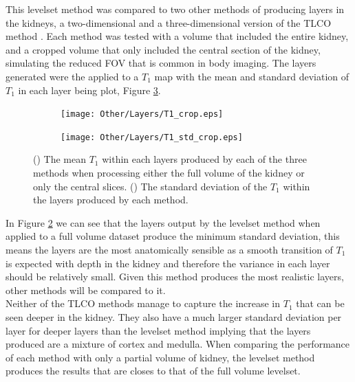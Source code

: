 This levelset method was compared to two other methods of producing layers in the kidneys, a two-dimensional and a three-dimensional version of the \ac{TLCO} method \cite{piskunowicz_new_2015, milani_reduction_2017}. Each method was tested with a volume that included the entire kidney, and a cropped volume that only included the central section of the kidney, simulating the reduced \ac{FOV} that is common in body imaging. The layers generated were the applied to a $T_1$ map with the mean and standard deviation of $T_1$ in each layer being plot, Figure \ref{fig:layers_comp}.

\begin{figure}[H]
	\centering
	\begin{subfigure}[c]{0.47\textwidth}
		\centering
		\texttt{[image: Other/Layers/T1\_crop.eps]}
		\caption{}
		\label{fig:layers_t1_comp}
	\end{subfigure}
	\hfill
	\begin{subfigure}[c]{0.47\textwidth}
		\centering
		\texttt{[image: Other/Layers/T1\_std\_crop.eps]}
		\caption{}
		\label{fig:layers_t1_std_comp}
	\end{subfigure}
	\caption{() The mean $T_1$ within each layers produced by each of the three methods when processing either the full volume of the kidney or only the central slices. () The standard deviation of the $T_1$ within the layers produced by each method.}
	\label{fig:layers_comp}
\end{figure}

In Figure \ref{fig:layers_t1_std_comp} we can see that the layers output by the levelset method when applied to a full volume dataset produce the minimum standard deviation, this means the layers are the most anatomically sensible as a smooth transition of $T_1$ is expected with depth in the kidney and therefore the variance in each layer should be relatively small. Given this method produces the most realistic layers, other methods will be compared to it.\\

Neither of the \ac{TLCO} methods manage to capture the increase in $T_1$ that can be seen deeper in the kidney. They also have a much larger standard deviation per layer for deeper layers than the levelset method implying that the layers produced are a mixture of cortex and medulla. When comparing the performance of each method with only a partial volume of kidney, the levelset method produces the results that are closes to that of the full volume levelset.\\

